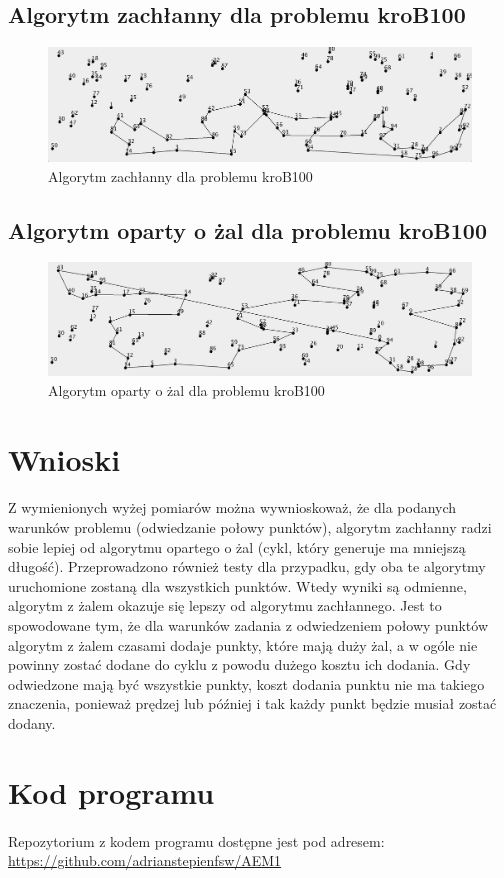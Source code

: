 \documentclass[a4paper]{article}
\begin{document}
\subsection{Algorytm zachłanny dla problemu kroB100}

\begin{figure}[H]
\centering
\includegraphics[width=\textwidth]{kroB_greedy}
\caption{Algorytm zachłanny dla problemu kroB100}
\end{figure}

\subsection{Algorytm oparty o żal dla problemu kroB100}

\begin{figure}[H]
\centering
\includegraphics[width=\textwidth]{kroB_regret}
\caption{Algorytm oparty o żal dla problemu kroB100}
\end{figure}

\section{Wnioski}
\paragraph{}
Z wymienionych wyżej pomiarów można wywnioskoważ, że dla podanych warunków problemu (odwiedzanie połowy punktów), algorytm zachłanny radzi sobie lepiej od algorytmu opartego o żal (cykl, który generuje ma mniejszą długość). Przeprowadzono również testy dla przypadku, gdy oba te algorytmy uruchomione zostaną dla wszystkich punktów. Wtedy wyniki są odmienne, algorytm z żalem okazuje się lepszy od algorytmu zachłannego. Jest to spowodowane tym, że dla warunków zadania z odwiedzeniem połowy punktów algorytm z żalem czasami dodaje punkty, które mają duży żal, a w ogóle nie powinny zostać dodane do cyklu z powodu dużego kosztu ich dodania. Gdy odwiedzone mają być wszystkie punkty, koszt dodania punktu nie ma takiego znaczenia, ponieważ prędzej lub później i tak każdy punkt będzie musiał zostać dodany. 

\section{Kod programu}
\paragraph{}
Repozytorium z kodem programu dostępne jest pod adresem: \url{https://github.com/adrianstepienfsw/AEM1}
\end{document}
